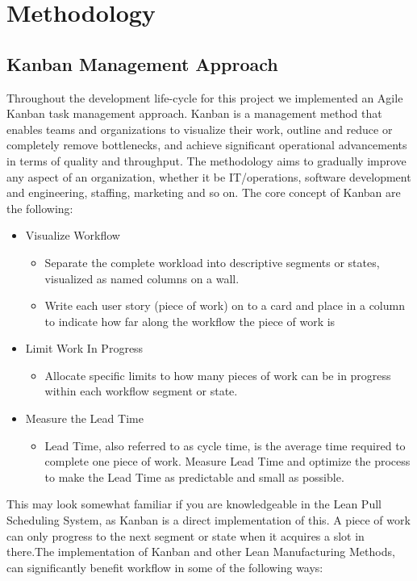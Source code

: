 \chapter{Methodology}
\section{Kanban Management Approach}
Throughout the development life-cycle for this project we implemented an Agile Kanban task management approach. Kanban is a management method that enables teams and organizations to visualize their work, outline and reduce or completely remove bottlenecks, and achieve significant operational advancements in terms of quality and throughput\cite{kanban}. The methodology aims to gradually improve any aspect of an organization, whether it be IT/operations, software development and engineering, staffing, marketing and so on. The core concept of Kanban are the following:
\begin{itemize}
\item Visualize Workflow
	\begin{itemize}
	\item Separate the complete workload into descriptive segments or states, visualized as named columns on a wall.
    \item Write each user story (piece of work) on to a card and place in a column to indicate how far along the workflow the piece of work is
  	\end{itemize}
\item Limit Work In Progress
	\begin{itemize}
	\item Allocate specific limits to how many pieces of work can be in progress within each workflow segment or state.
	\end{itemize}
\item Measure the Lead Time
	\begin{itemize}
	\item Lead Time, also referred to as cycle time, is the average time required to complete one piece of work. Measure Lead Time and optimize the process to make the Lead Time as predictable and small as possible.
	\end{itemize}
\end{itemize}

This may look somewhat familiar if you are knowledgeable in the Lean Pull Scheduling System, as Kanban is a direct implementation of this\cite{kanban}. A piece of work can only progress to the next segment or state when it acquires a slot in there.The implementation of Kanban and other Lean Manufacturing Methods, can significantly benefit workflow in some of the following ways:

